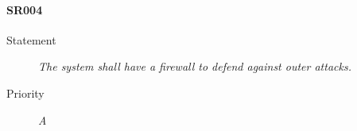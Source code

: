 \paragraph{SR004}
  \begin{description}
  \item [Statement] 
    \textit{ The system shall have a firewall to defend against outer attacks.}
  \item [Priority] \textit{A}
\end{description}